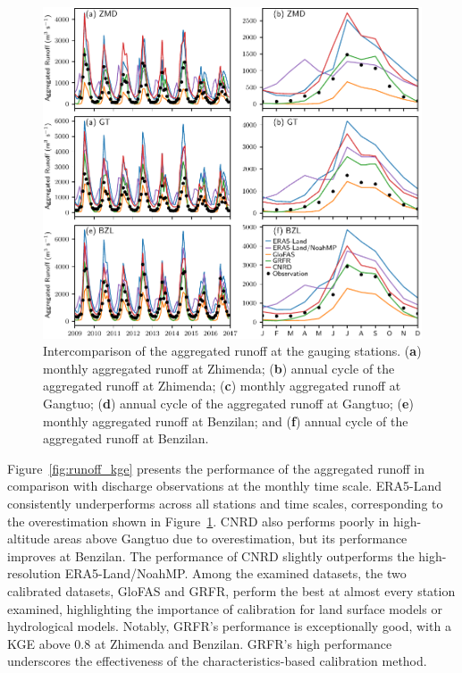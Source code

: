 \documentclass[water,article,submit,pdftex,moreauthors]{Definitions/mdpi}
\begin{document}
\begin{figure}[H]
  \centering
  \includegraphics[width=\textwidth]{runoff_agg_ts.pdf}
  \caption{Intercomparison of the aggregated runoff at the gauging stations. (\textbf{a}) monthly aggregated runoff at Zhimenda; (\textbf{b}) annual cycle of the aggregated runoff at Zhimenda; (\textbf{c}) monthly aggregated runoff at Gangtuo; (\textbf{d}) annual cycle of the aggregated runoff at Gangtuo; (\textbf{e}) monthly aggregated runoff at Benzilan; and (\textbf{f}) annual cycle of the aggregated runoff at Benzilan.\label{fig:runoff_agg_ts}}
\end{figure}

Figure~\ref{fig:runoff_kge} presents the performance of the aggregated runoff in comparison with discharge observations at the monthly time scale. ERA5-Land consistently underperforms across all stations and time scales, corresponding to the overestimation shown in Figure~\ref{fig:runoff_agg_ts}. CNRD also performs poorly in high-altitude areas above Gangtuo due to overestimation, but its performance improves at Benzilan. The performance of CNRD slightly outperforms the high-resolution ERA5-Land/NoahMP. Among the examined datasets, the two calibrated datasets, GloFAS and GRFR, perform the best at almost every station examined, highlighting the importance of calibration for land surface models or hydrological models. Notably, GRFR's performance is exceptionally good, with a KGE above 0.8 at Zhimenda and Benzilan. GRFR's high performance underscores the effectiveness of the characteristics-based calibration method.
\end{document}
